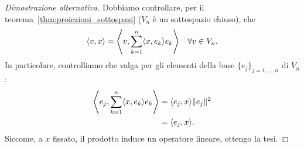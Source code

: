 \begin{proof}[Dimostrazione alternativa]

Dobbiamo controllare, per il teorema~\ref{thm:proiezioni_sottospazi} (\(V_n\) è un sottospazio chiuso), che  
\[
\langle v, x \rangle = {\left\langle v, \sum_{k=1}^n \langle x, e_k \rangle e_k\right\rangle} \quad \forall v \in V_n.
\]  
In particolare, controlliamo che valga per gli elementi della base
\(\{e_j\}_{j=1, \dots, n}\) di \(V_n\):  
\[
\begin{aligned}
  {\left\langle e_j, \sum_{k=1}^n \langle x, e_k \rangle e_k\right\rangle} &= \langle e_j, x \rangle \|e_j\|^2 \\
  &= \langle e_j, x \rangle.
\end{aligned}
\]
Siccome, a \(x\) fissato, il prodotto induce un operatore lineare, ottengo la tesi.     
\end{proof}

